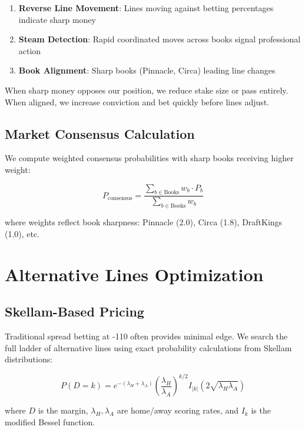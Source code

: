 \begin{enumerate}
  \item \textbf{Reverse Line Movement}: Lines moving against betting percentages indicate sharp money
  \item \textbf{Steam Detection}: Rapid coordinated moves across books signal professional action
  \item \textbf{Book Alignment}: Sharp books (Pinnacle, Circa) leading line changes
\end{enumerate}

When sharp money opposes our position, we reduce stake size or pass entirely. When aligned, we increase conviction and bet quickly before lines adjust.

\subsection{Market Consensus Calculation}

We compute weighted consensus probabilities with sharp books receiving higher weight:

\begin{equation}
P_{\text{consensus}} = \frac{\sum_{b \in \text{Books}} w_b \cdot P_b}{\sum_{b \in \text{Books}} w_b}
\end{equation}

where weights reflect book sharpness: Pinnacle (2.0), Circa (1.8), DraftKings (1.0), etc.

\section{Alternative Lines Optimization}

\subsection{Skellam-Based Pricing}

Traditional spread betting at -110 often provides minimal edge. We search the full ladder of alternative lines using exact probability calculations from Skellam distributions:

\begin{equation}
P(D = k) = e^{-(\lambda_H + \lambda_A)} \left(\frac{\lambda_H}{\lambda_A}\right)^{k/2} I_{|k|}(2\sqrt{\lambda_H \lambda_A})
\end{equation}

where $D$ is the margin, $\lambda_H, \lambda_A$ are home/away scoring rates, and $I_k$ is the modified Bessel function.

